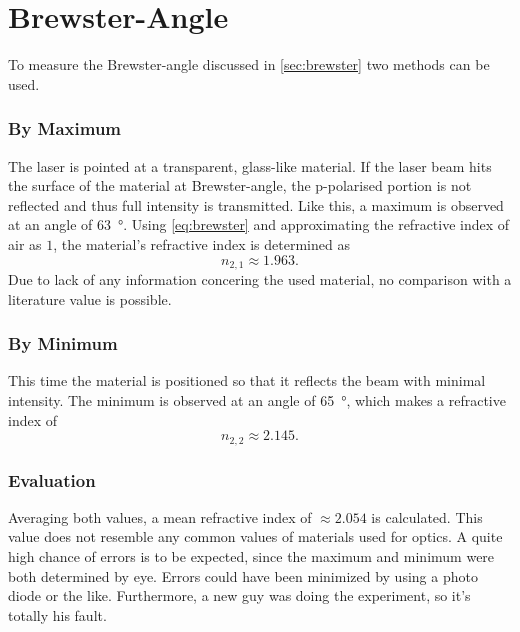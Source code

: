 \chapter{Brewster-Angle}
To measure the Brewster-angle discussed in \autoref{sec:brewster} two methods can be used.

\subsection{By Maximum}
The laser is pointed at a transparent, glass-like material.
If the laser beam hits the surface of the material at Brewster-angle, the p-polarised portion is not reflected and thus full intensity is transmitted.
Like this, a maximum is observed at an angle of \SI{63}{\degree}.
Using \autoref{eq:brewster} and approximating the refractive index of air as $1$, the material's refractive index is determined as
\begin{equation*}
	n_{2,1}\approx\num{1.963}.
\end{equation*}
Due to lack of any information concering the used material, no comparison with a literature value is possible.

\subsection{By Minimum}
This time the material is positioned so that it reflects the beam with minimal intensity.
The minimum is observed at an angle of \SI{65}{\degree}, which makes a refractive index of
\begin{equation*}
	n_{2,2}\approx\num{2.145}.
\end{equation*}

\subsection{Evaluation}
Averaging both values, a mean refractive index of $\approx\num{2.054}$ is calculated.
This value does not resemble any common values of materials used for optics.
A quite high chance of errors is to be expected, since the maximum and minimum were both determined by eye.
Errors could have been minimized by using a photo diode or the like.
Furthermore, a new guy was doing the experiment, so it's totally his fault.
